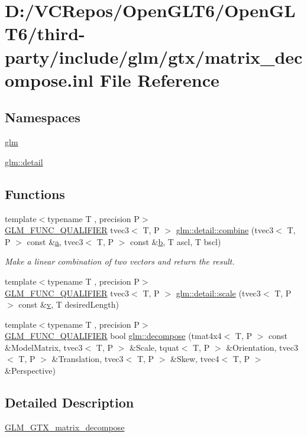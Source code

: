\hypertarget{matrix__decompose_8inl}{}\section{D\+:/\+V\+C\+Repos/\+Open\+G\+L\+T6/\+Open\+G\+L\+T6/third-\/party/include/glm/gtx/matrix\+\_\+decompose.inl File Reference}
\label{matrix__decompose_8inl}
\subsection*{Namespaces}
\begin{DoxyCompactItemize}
\item 
 \mbox{\hyperlink{namespaceglm}{glm}}
\item 
 \mbox{\hyperlink{namespaceglm_1_1detail}{glm\+::detail}}
\end{DoxyCompactItemize}
\subsection*{Functions}
\begin{DoxyCompactItemize}
\item 
{\footnotesize template$<$typename T , precision P$>$ }\\\mbox{\hyperlink{setup_8hpp_a33fdea6f91c5f834105f7415e2a64407}{G\+L\+M\+\_\+\+F\+U\+N\+C\+\_\+\+Q\+U\+A\+L\+I\+F\+I\+ER}} tvec3$<$ T, P $>$ \mbox{\hyperlink{namespaceglm_1_1detail_ae1c6c18912ed1a03fc850bb11755213c}{glm\+::detail\+::combine}} (tvec3$<$ T, P $>$ const \&\mbox{\hyperlink{glad_8h_ac8729153468b5dcf13f971b21d84d4e5}{a}}, tvec3$<$ T, P $>$ const \&\mbox{\hyperlink{glad_8h_a6eba317e3cf44d6d26c04a5a8f197dcb}{b}}, T ascl, T bscl)
\begin{DoxyCompactList}\small\item\em Make a linear combination of two vectors and return the result. \end{DoxyCompactList}\item 
{\footnotesize template$<$typename T , precision P$>$ }\\\mbox{\hyperlink{setup_8hpp_a33fdea6f91c5f834105f7415e2a64407}{G\+L\+M\+\_\+\+F\+U\+N\+C\+\_\+\+Q\+U\+A\+L\+I\+F\+I\+ER}} tvec3$<$ T, P $>$ \mbox{\hyperlink{namespaceglm_1_1detail_af47639907c02055dc95ef962e0ca9a02}{glm\+::detail\+::scale}} (tvec3$<$ T, P $>$ const \&\mbox{\hyperlink{glad_8h_a14cfbe2fc2234f5504618905b69d1e06}{v}}, T desired\+Length)
\item 
{\footnotesize template$<$typename T , precision P$>$ }\\\mbox{\hyperlink{setup_8hpp_a33fdea6f91c5f834105f7415e2a64407}{G\+L\+M\+\_\+\+F\+U\+N\+C\+\_\+\+Q\+U\+A\+L\+I\+F\+I\+ER}} bool \mbox{\hyperlink{group__gtx__matrix__decompose_ga0f1245817507156b337798a253577c8b}{glm\+::decompose}} (tmat4x4$<$ T, P $>$ const \&Model\+Matrix, tvec3$<$ T, P $>$ \&Scale, tquat$<$ T, P $>$ \&Orientation, tvec3$<$ T, P $>$ \&Translation, tvec3$<$ T, P $>$ \&Skew, tvec4$<$ T, P $>$ \&Perspective)
\end{DoxyCompactItemize}


\subsection{Detailed Description}
\mbox{\hyperlink{group__gtx__matrix__decompose}{G\+L\+M\+\_\+\+G\+T\+X\+\_\+matrix\+\_\+decompose}} 